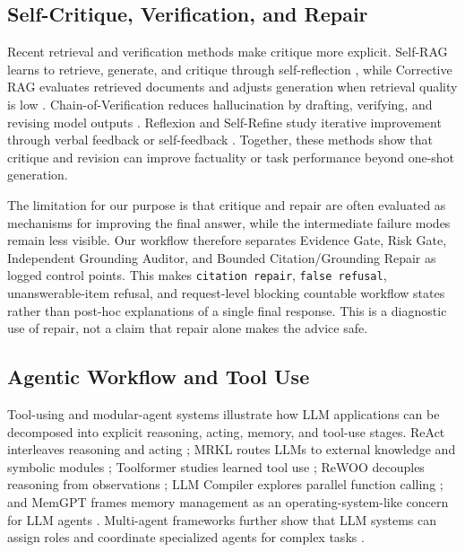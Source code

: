 \subsection{Self-Critique, Verification, and Repair}

Recent retrieval and verification methods make critique more explicit. Self-RAG learns to retrieve, generate, and critique through self-reflection \cite{asai2023selfrag}, while Corrective RAG evaluates retrieved documents and adjusts generation when retrieval quality is low \cite{yan2024crag}. Chain-of-Verification reduces hallucination by drafting, verifying, and revising model outputs \cite{dhuliawala2023cove}. Reflexion and Self-Refine study iterative improvement through verbal feedback or self-feedback \cite{shinn2023reflexion,madaan2023selfrefine}. Together, these methods show that critique and revision can improve factuality or task performance beyond one-shot generation.

The limitation for our purpose is that critique and repair are often evaluated as mechanisms for improving the final answer, while the intermediate failure modes remain less visible. Our workflow therefore separates Evidence Gate, Risk Gate, Independent Grounding Auditor, and Bounded Citation/Grounding Repair as logged control points. This makes \texttt{citation repair}, \texttt{false refusal}, unanswerable-item refusal, and request-level blocking countable workflow states rather than post-hoc explanations of a single final response. This is a diagnostic use of repair, not a claim that repair alone makes the advice safe.

\subsection{Agentic Workflow and Tool Use}

Tool-using and modular-agent systems illustrate how LLM applications can be decomposed into explicit reasoning, acting, memory, and tool-use stages. ReAct interleaves reasoning and acting \cite{yao2022react}; MRKL routes LLMs to external knowledge and symbolic modules \cite{karpas2022mrkl}; Toolformer studies learned tool use \cite{schick2023toolformer}; ReWOO decouples reasoning from observations \cite{xu2023rewoo}; LLM Compiler explores parallel function calling \cite{kim2023llmcompiler}; and MemGPT frames memory management as an operating-system-like concern for LLM agents \cite{packer2023memgpt}. Multi-agent frameworks further show that LLM systems can assign roles and coordinate specialized agents for complex tasks \cite{wu2023autogen,hong2023metagpt,du2023debate}.

